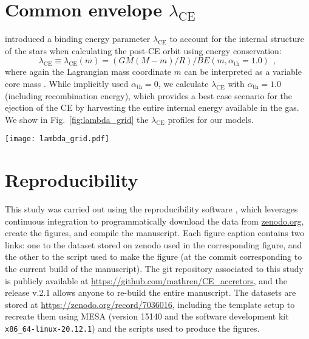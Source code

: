 \documentclass[twocolumn,twocolappendix,trackchanges]{aastex63}
\DeclareRobustCommand{\Figref}[1]{Fig.~\ref{#1}}
\begin{document}
\section{Common envelope $\lambda_\mathrm{CE}$}
\label{sec:pop_synth_app}

\cite{dekool:1990} introduced a binding energy parameter
$\lambda_\mathrm{CE}$ to account for the internal structure of the
stars when calculating the post-CE orbit using energy conservation:
\begin{equation}
  \label{eq:lambda}
  \lambda_\mathrm{CE} \equiv \lambda_\mathrm{CE}(m) = (GM(M-m)/R)/BE(m, \alpha_\mathrm{th}=1.0) \ \ ,
\end{equation}
where again the Lagrangian mass coordinate $m$ can be interpreted as a
variable core mass \citep[see also][]{demarco:11, ivanova:2013}. While
\cite{dekool:1990} implicitly used
  $\alpha_\mathrm{th}=0$, we calculate $\lambda_\mathrm{CE}$ with
  $\alpha_\mathrm{th}=1.0$ (including recombination energy), which provides a best case scenario for
  the ejection of the CE by harvesting the entire internal energy
  available in the gas. We show
in \Figref{fig:lambda_grid} the $\lambda_\mathrm{CE}$ profiles for our models.

\begin{figure*}[htbp]
  \centering
  \texttt{[image: lambda\_grid.pdf]}
  \caption{Profile of the binding energy parameter
    $\lambda_\mathrm{CE}$ as a function of mass coordinate for
    accretors (orange), single stars (red), and our engineered stars
    (other colors) at selected total radii. The vertical lines mark
    the outer edge of the helium cores of the accretor and single
    star, that is the outermost location where $Y>0.1$ and $X<0.01$
    (solid lines), or $X<0.1$ (dashed), or $X<0.2$
    (dot-dashed). The CEB size of engineered models
      increases from blue to yellow.}
  \label{fig:lambda_grid}
\end{figure*}


\section{Reproducibility}
\label{sec:reproducibility}

This study was carried out using the reproducibility software
\href{https://github.com/showyourwork/showyourwork}{\showyourwork}
\citep{showyourwork}, which leverages continuous integration to
programmatically download the data from \href{zenodo.org}{zenodo.org},
create the figures, and compile the manuscript. Each figure caption
contains two links: one to the dataset stored on zenodo used in the
corresponding figure, and the other to the script used to make the
figure (at the commit corresponding to the current build of the
manuscript). The git repository associated to this study is publicly
available at \url{https://github.com/mathren/CE_accretors}, and the
release v.2.1 allows anyone to re-build the entire manuscript. The
datasets are stored at \url{https://zenodo.org/record/7036016},
including the template setup to recreate them using MESA (version 15140
and the software development kit \texttt{x86\_64-linux-20.12.1}) and
the scripts used to produce the figures.
\end{document}
